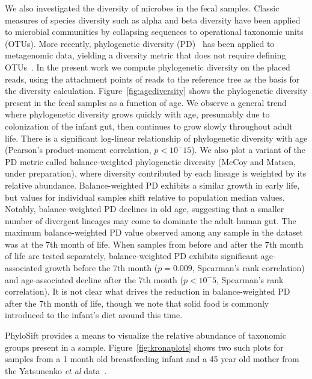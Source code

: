 \documentclass[10pt]{article}
\begin{document}
We also investigated the diversity of microbes in the fecal samples.
Classic measures of species diversity such as alpha and beta diversity have been applied to microbial communities by collapsing sequences to operational taxonomic units (OTUs).
More recently, phylogenetic diversity (PD)~\cite{Faith1992} has been applied to metagenomic data, yielding a diversity metric that does not require defining OTUs~\cite{Kembel2011}.
In the present work we compute phylogenetic diversity on the placed reads, using the attachment points of reads to the reference tree as the basis for the diversity calculation.
Figure~\ref{fig:agediversity} shows the phylogenetic diversity present in the fecal samples as a function of age.
We observe a general trend where phylogenetic diversity grows quickly with age, presumably due to colonization of the infant gut, then continues to grow slowly throughout adult life.
There is a significant log-linear relationship of phylogenetic diversity with age (Pearson's product-moment correlation, $p<10^-15$).
We also plot a variant of the PD metric called balance-weighted phylogenetic diversity (McCoy and Matsen, under preparation), where diversity contributed by each lineage is weighted by its relative abundance.
Balance-weighted PD exhibits a similar growth in early life, but values for individual samples shift relative to population median values.
Notably, balance-weighted PD declines in old age, suggesting that a smaller number of divergent lineages may come to dominate the adult human gut.
The maximum balance-weighted PD value observed among any sample in the dataset was at the 7th month of life.
When samples from before and after the 7th month of life are tested separately, balance-weighted PD exhibits significant age-associated growth before the 7th month ($p=0.009$, Spearman's rank correlation) and age-associated decline after the 7th month ($p<10^-5$, Spearman's rank correlation).
It is not clear what drives the reduction in balance-weighted PD after the 7th month of life, though we note that solid food is commonly introduced to the infant's diet around this time.

PhyloSift provides a means to visualize the relative abundance of taxonomic groups present in a sample.
Figure~\ref{fig:kronaplots} shows two such plots for samples from a 1 month old breastfeeding infant and a 45 year old mother from the Yatsunenko \textit{et al} data~\cite{Yatsunenko2012}.
\end{document}
